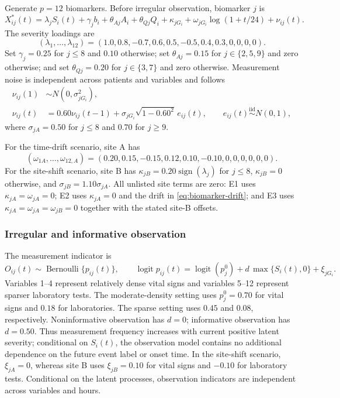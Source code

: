 \documentclass[11pt]{article}
\newcommand{\logit}{\operatorname{logit}}
\begin{document}
Generate $p=12$ biomarkers. Before irregular observation, biomarker $j$ is
\begin{equation}
X_{ij}^{\ast}(t)=
\lambda_jS_i(t)+\gamma_jb_i+\theta_{Aj}A_i+\theta_{Qj}Q_i
+\kappa_{jG_i}+\omega_{jG_i}\log(1+t/24)+\nu_{ij}(t).
\label{eq:biomarker-dgp}
\end{equation}
The severity loadings are
\begin{equation}
(\lambda_1,\ldots,\lambda_{12})
=(1.0,0.8,-0.7,0.6,0.5,-0.5,0.4,0.3,0,0,0,0).
\label{eq:severity-loadings}
\end{equation}
Set $\gamma_j=0.25$ for $j\le8$ and $0.10$ otherwise; set $\theta_{Aj}=0.15$ for $j\in\{2,5,9\}$ and zero otherwise; and set $\theta_{Qj}=0.20$ for $j\in\{3,7\}$ and zero otherwise. Measurement noise is independent across patients and variables and follows
\begin{align}
\nu_{ij}(1)&\sim N(0,\sigma_{jG_i}^2),\nonumber\\
\nu_{ij}(t)&=0.60\nu_{ij}(t-1)
+\sigma_{jG_i}\sqrt{1-0.60^2}\,e_{ij}(t),
\qquad e_{ij}(t)\stackrel{\mathrm{iid}}{\sim}N(0,1),
\label{eq:biomarker-noise}
\end{align}
where $\sigma_{jA}=0.50$ for $j\le8$ and $0.70$ for $j\ge9$.

For the time-drift scenario, site A has
\begin{equation}
(\omega_{1A},\ldots,\omega_{12,A})
=(0.20,0.15,-0.15,0.12,0.10,-0.10,0,0,0,0,0,0).
\label{eq:biomarker-drift}
\end{equation}
For the site-shift scenario, site B has $\kappa_{jB}=0.20\operatorname{sign}(\lambda_j)$ for $j\le8$, $\kappa_{jB}=0$ otherwise, and $\sigma_{jB}=1.10\sigma_{jA}$. All unlisted site terms are zero: E1 uses $\kappa_{jA}=\omega_{jA}=0$; E2 uses $\kappa_{jA}=0$ and the drift in \eqref{eq:biomarker-drift}; and E3 uses $\kappa_{jA}=\omega_{jA}=\omega_{jB}=0$ together with the stated site-B offsets.

\subsubsection{Irregular and informative observation}

The measurement indicator is
\begin{equation}
O_{ij}(t)\sim\operatorname{Bernoulli}\{p_{ij}(t)\},
\qquad
\logit p_{ij}(t)=\logit(p_j^0)+d\,\max\{S_i(t),0\}+\xi_{jG_i}.
\label{eq:obs-dgp}
\end{equation}
Variables 1--4 represent relatively dense vital signs and variables 5--12 represent sparser laboratory tests. The moderate-density setting uses $p_j^0=0.70$ for vital signs and $0.18$ for laboratories. The sparse setting uses $0.45$ and $0.08$, respectively. Noninformative observation has $d=0$; informative observation has $d=0.50$. Thus measurement frequency increases with current positive latent severity; conditional on $S_i(t)$, the observation model contains no additional dependence on the future event label or onset time. In the site-shift scenario, $\xi_{jA}=0$, whereas site B uses $\xi_{jB}=0.10$ for vital signs and $-0.10$ for laboratory tests. Conditional on the latent processes, observation indicators are independent across variables and hours.
\end{document}
